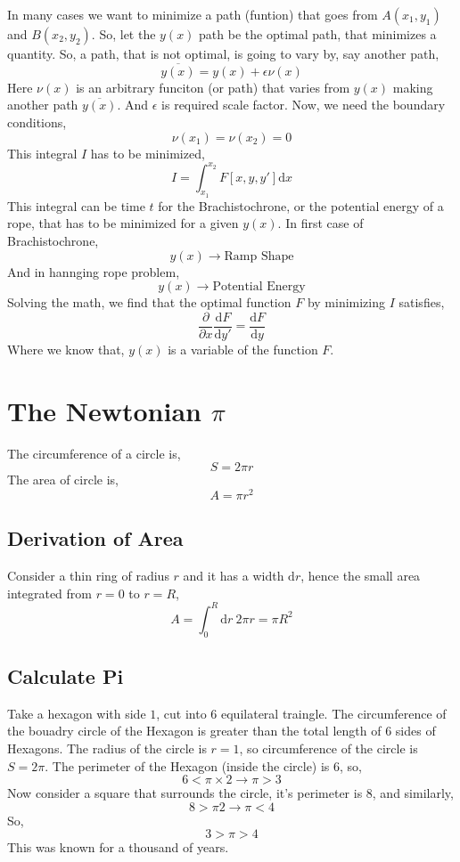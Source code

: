 \documentclass[a4paper, 11pt,twoside]{memoir}
\begin{document}
In many cases we want to minimize a path (funtion) that goes from $A(x_1,y_1)$ and $B(x_2,y_2)$. So, let the $y(x)$ path be the optimal path, that minimizes a quantity. So, a path, that is not optimal, is going to vary by, say another path,
\[ 
    \overline{y(x)} = y(x) + \epsilon \nu(x)
\] Here $\nu(x)$ is an arbitrary funciton (or path) that varies from $y(x)$ making another path $\overline{y(x)}$. And $\epsilon$ is required scale factor. Now, we need the boundary conditions,
\[ 
    \nu(x_1) = \nu(x_2) = 0 
\] This integral $I$ has to be minimized, 
\[ 
    I = \int_{x_1}^{x_2}  F[x,y,y'] \mathrm{d} x  
\] This integral can be time $t$ for the Brachistochrone, or the potential energy of a rope, that has to be minimized for a given $y(x)$. In first case of Brachistochrone, \[ 
y(x) \to \text{Ramp Shape}
\] And in hannging rope problem,
\[ 
    y(x) \to \text{Potential Energy}
\]
Solving the math, we find that the optimal function $F$ by minimizing $I$ satisfies, 
\[ 
\frac{\partial }{\partial x} \frac{\mathrm{d} F}{\mathrm{d} y'} = \frac{\mathrm{d} F }{\mathrm{d} y}
\]
Where we know that, $y(x)$ is a variable of the function $F$. 

\chapter{ The Newtonian $\pi$ }

 The circumference of a circle is,
    \[ 
    S = 2\pi r
    \] The area of circle is,
    \[ 
    A = \pi r^2
    \]
    \section{ Derivation of Area }
Consider a thin ring of radius $r$ and it has a width $\mathrm{d}  r$, hence the small area integrated from $r=0$ to $r=R$,
\[ 
A = \int_{0}^{R} \mathrm{d} r \ 2 \pi r = \pi R^2 
\]

    \section{ Calculate Pi }
    Take a hexagon with side $1$, cut into 6 equilateral traingle. The circumference of the bouadry circle of the Hexagon is greater than the total length of 6 sides of Hexagons. The radius of the circle is $r=1$, so circumference of the circle is $S = 2 \pi$. The perimeter of the Hexagon (inside the circle) is 6, so,
    \[ 
    6 < \pi \times  2 \to \pi > 3
    \] 
    Now consider a square that surrounds the circle, it's perimeter is 8, and similarly,
    \[ 
    8 > \pi 2 \to \pi < 4
    \] 
    So, \[ 
    3 > \pi > 4
    \]This was known for a thousand of years. 
\end{document}
